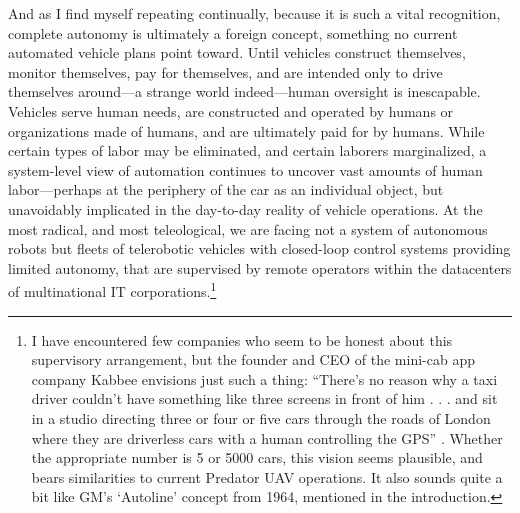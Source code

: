 And as I find myself repeating continually, because it is such a vital
recognition, complete autonomy is ultimately a foreign concept,
something no current automated vehicle plans point toward. Until
vehicles construct themselves, monitor themselves, pay for themselves,
and are intended only to drive themselves around---a strange world
indeed---human oversight is inescapable. Vehicles serve human needs,
are constructed and operated by humans or organizations made of
humans, and are ultimately paid for by humans. While certain types of
labor may be eliminated, and certain laborers marginalized, a
system-level view of automation continues to uncover vast amounts of
human labor---perhaps at the periphery of the car as an individual
object, but unavoidably implicated in the day-to-day reality of
vehicle operations. At the most radical, and most teleological, we are
facing not a system of autonomous robots but fleets of telerobotic
vehicles with closed-loop control systems providing limited autonomy,
that are supervised by remote operators within the datacenters of
multinational IT corporations.\footnote{I have encountered few
  companies who seem to be honest about this supervisory arrangement,
  but the founder and CEO of the mini-cab app company Kabbee envisions
just such a thing: ``There's no reason why a taxi driver couldn't have
something like three screens in front of him . . . and sit in a studio
directing three or four or five cars through the roads of London where
they are driverless cars with a human controlling the GPS''
\cite{forbesDawson}.
Whether the appropriate number is 5 or 5000 cars, this vision seems
plausible, and bears similarities to current Predator UAV operations.
It also sounds quite a bit like GM's `Autoline' concept from 1964,
mentioned in the introduction.}


